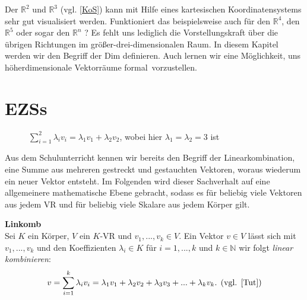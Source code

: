 
Der $\mathbb{R}^2$ und $\mathbb{R}^3$ (vgl. \ref{KoS}) kann mit Hilfe eines kartesischen Koordinatensystems sehr gut visualisiert werden. Funktioniert das beispielsweise auch für den $\mathbb{R}^4$, den $\mathbb{R}^5$ oder sogar den $\mathbb{R}^n$ ? Es fehlt uns lediglich die Vorstellungskraft über die übrigen Richtungen im größer-drei-dimensionalen Raum. In diesem Kapitel werden wir den Begriff der \acl{Dim} definieren.
Auch lernen wir eine Möglichkeit, uns höherdimensionale Vektorräume \glqq formal\grqq \, vorzustellen.

\section{\aclp{EZS}}
\label{Erz}

\begin{figure}[h]
\centering
\def\svgwidth{150pt}

\caption{\(\sum \limits_{i=1}^{2} \lambda_i v_i = \lambda_1 v_1 + \lambda_2 v_2\), wobei hier $\lambda_1=\lambda_2=3$ ist}
\label{linkombgrafik}
\end{figure}

Aus dem Schulunterricht kennen wir bereits den Begriff der Linearkombination, eine Summe aus mehreren gestreckt und gestauchten Vektoren, woraus wiederum ein neuer Vektor entsteht. Im Folgenden wird dieser Sachverhalt auf eine allgemeinere mathematische Ebene gebracht, sodass es für beliebig viele Vektoren aus jedem \acl{VR} und für beliebig viele Skalare aus jedem Körper gilt.

\theoremstyle{definition}
\begin{definition}{\textbf{\acl{Linkomb}}}
\\Sei $K$ ein Körper, $V$ ein $K$-\acl{VR} und ${v_1,...,v_k \in V}$. Ein Vektor $v \in V$ lässt sich mit $v_1,...,v_k$ und den Koeffizienten $\lambda_i \in K$ für $i=1,...,k$ und $k \in \mathbb{N}$ wir folgt \emph{linear kombinieren}:
\[v = \sum_{i=1}^k \lambda_i v_i = \lambda_1 v_1 + \lambda_2 v_2 + \lambda_3 v_3 + ... + \lambda_k v_k \text{. (vgl. \cite[S. 298, 16.3]{Tut})}\]
\end{definition}

